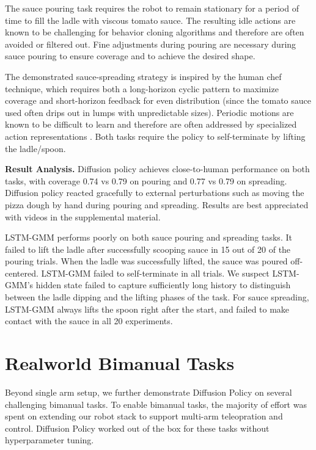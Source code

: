 \documentclass[Afour,sageh,times]{sagej}
\begin{document}
The sauce pouring task requires the robot to remain stationary for a period of time to fill the ladle with viscous tomato sauce. The resulting idle actions are known to be challenging for behavior cloning algorithms and therefore are often avoided or filtered out. Fine adjustments during pouring are necessary during sauce pouring to ensure coverage and to achieve the desired shape.

The demonstrated sauce-spreading strategy is inspired by the human chef technique, which requires both a long-horizon cyclic pattern to maximize coverage and short-horizon feedback for even distribution (since the tomato sauce used often drips out in lumps with unpredictable sizes). Periodic motions are known to be difficult to learn and therefore are often addressed by specialized action representations \cite{yang2022periodic}.
Both tasks require the policy to self-terminate by lifting the ladle/spoon.




\textbf{Result Analysis.}
Diffusion policy achieves close-to-human performance on both tasks, with coverage 0.74 vs 0.79 on pouring and 0.77 vs 0.79 on spreading.
Diffusion policy reacted gracefully to external perturbations such as moving the pizza dough by hand during pouring and spreading.
Results are best appreciated with videos in the supplemental material.

LSTM-GMM performs poorly on both sauce pouring and spreading tasks. It failed to lift the ladle after successfully scooping sauce in 15 out of 20 of the pouring trials. When the ladle was successfully lifted, the sauce was poured off-centered. LSTM-GMM failed to self-terminate in all trials. We suspect LSTM-GMM's hidden state failed to capture sufficiently long history to distinguish between the ladle dipping and the lifting phases of the task. For sauce spreading, LSTM-GMM always lifts the spoon right after the start, and failed to make contact with the sauce in all 20 experiments.
\section{Realworld Bimanual Tasks}
\label{sec:eval_bimanual}
Beyond single arm setup, we further demonstrate Diffusion Policy on several challenging bimanual tasks. To enable bimanual tasks, the majority of effort was spent on extending our robot stack to support multi-arm teleopration and control. Diffusion Policy worked out of the box for these tasks without hyperparameter tuning.
\end{document}
